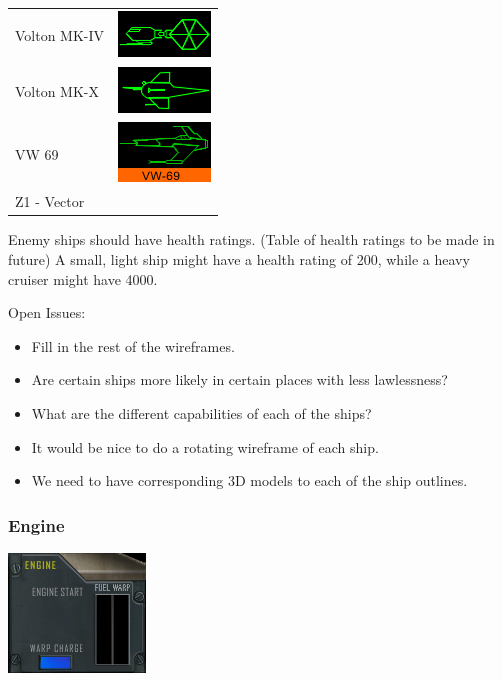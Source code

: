 \begin{itemize}
\begin{tabular}{ | l | l | }
Volton MK-IV & \includegraphics[scale=0.75]{images/ship_Voton_MK_IV.png} \\
Volton MK-X & \includegraphics[scale=0.75]{images/ship_Voton_MK_X.png} \\
VW 69 & \includegraphics[scale=0.75]{images/ship_VW-69.png} \\
Z1 - Vector & \\
\hline
\end{tabular}

Enemy ships should have health ratings. (Table of health ratings to be made in future) A small, light ship might have a health rating of 200, while a heavy cruiser might have 4000. 


Open Issues:
\begin{itemize}
\item Fill in the rest of the wireframes.
\item Are certain ships more likely in certain places with less lawlessness?
\item What are the different capabilities of each of the ships?
\item It would be nice to do a rotating wireframe of each ship.
\item We need to have corresponding 3D models to each of the ship outlines.
\end{itemize}

\subsubsection{Engine}
\includegraphics[scale=0.70]{images/engine.png}


\end{itemize}

